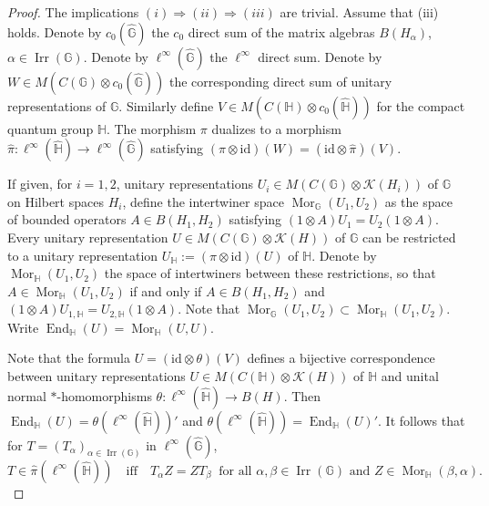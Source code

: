 \documentclass[10pt,a4paper]{amsart}
\begin{document}
\begin{proof}
The implications $(i) \Rightarrow (ii) \Rightarrow (iii)$ are trivial. Assume that (iii) holds. Denote by $c_0(\widehat{\mathbb{G}})$ the $c_0$ direct sum of the matrix algebras $B(H_\alpha)$, $\alpha \in \operatorname{Irr}(\mathbb{G})$. Denote by $\ell^\infty(\widehat{\mathbb{G}})$ the $\ell^\infty$ direct sum. Denote by $W \in M(C(\mathbb{G}) \otimes c_0(\widehat{\mathbb{G}}))$ the corresponding direct sum of unitary representations of $\mathbb{G}$. Similarly define $V \in M(C(\mathbb{H}) \otimes c_0(\widehat{\mathbb{H}}))$ for the compact quantum group $\mathbb{H}$. The morphism $\pi$ dualizes to a morphism $\widehat{\pi} : \ell^\infty(\widehat{\mathbb{H}}) \to \ell^\infty(\widehat{\mathbb{G}})$ satisfying $(\pi \otimes \mathrm{id})(W) = (\mathrm{id} \otimes \widehat{\pi})(V)$.

\bigskip

If given, for $i = 1,2$, unitary representations $U_i \in M(C(\mathbb{G}) \otimes \mathcal{K}(H_i))$ of $\mathbb{G}$ on Hilbert spaces $H_i$, define the intertwiner space $\operatorname{Mor}_\mathbb{G}(U_1,U_2)$ as the space of bounded operators $A \in B(H_1,H_2)$ satisfying $(1 \otimes A) U_1 = U_2 (1 \otimes A)$. Every unitary representation $U \in M(C(\mathbb{G}) \otimes \mathcal{K}(H))$ of $\mathbb{G}$ can be restricted to a unitary representation $U_\mathbb{H} := (\pi \otimes \mathrm{id})(U)$ of $\mathbb{H}$. Denote by $\operatorname{Mor}_\mathbb{H}(U_1,U_2)$ the space of intertwiners between these restrictions, so that $A \in \operatorname{Mor}_\mathbb{H}(U_1,U_2)$ if and only if $A \in B(H_1,H_2)$ and $(1 \otimes A) U_{1,\mathbb{H}} = U_{2,\mathbb{H}} (1 \otimes A)$. Note that $\operatorname{Mor}_\mathbb{G}(U_1,U_2) \subset \operatorname{Mor}_\mathbb{H}(U_1,U_2)$. Write $\operatorname{End}_\mathbb{H}(U) = \operatorname{Mor}_\mathbb{H}(U,U)$.

\bigskip

Note that the formula $U = (\mathrm{id} \otimes \theta)(V)$ defines a bijective correspondence between unitary representations $U \in M(C(\mathbb{H}) \otimes \mathcal{K}(H))$ of $\mathbb{H}$ and unital normal $*$-homomorphisms $\theta : \ell^\infty(\widehat{\mathbb{H}}) \to B(H)$. Then $\operatorname{End}_\mathbb{H}(U) = \theta(\ell^\infty(\widehat{\mathbb{H}}))'$ and $\theta(\ell^\infty(\widehat{\mathbb{H}})) = \operatorname{End}_\mathbb{H}(U)'$. It follows that for $T = (T_\alpha)_{\alpha \in \operatorname{Irr}(\mathbb{G})}$ in $\ell^\infty(\widehat{\mathbb{G}})$,
\begin{equation}\label{eq.rel-com}
T \in \widehat{\pi}(\ell^\infty(\widehat{\mathbb{H}})) \quad\text{iff}\quad T_\alpha Z = Z T_\beta \;\;\text{for all $\alpha,\beta \in \operatorname{Irr}(\mathbb{G})$ and $Z \in \operatorname{Mor}_\mathbb{H}(\beta,\alpha)$.}
\end{equation}



\end{proof}
\end{document}
